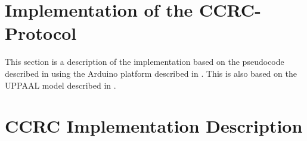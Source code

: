 \section{Implementation of the CCRC-Protocol}
This section is a description of the implementation based on the pseudocode described in  using the Arduino platform described in . 
This is also based on the UPPAAL model described in .
\section{CCRC Implementation Description}


